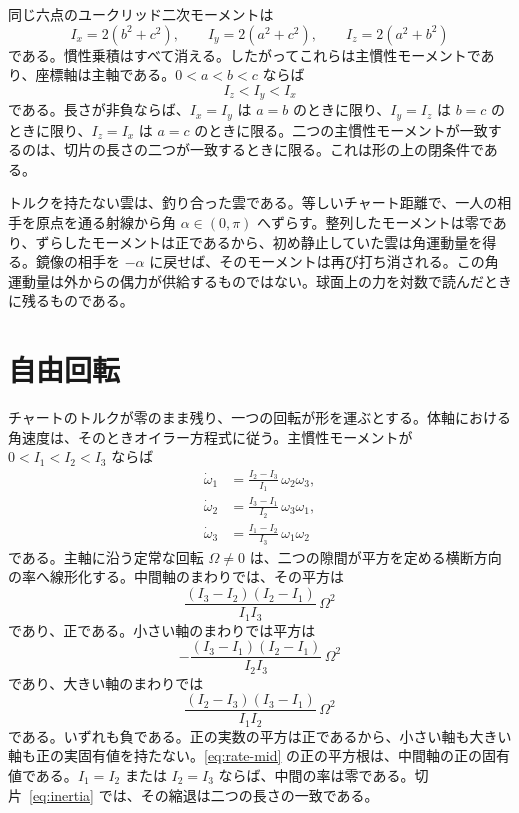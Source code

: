 \documentclass[a4paper]{article}
\begin{document}
同じ六点のユークリッド二次モーメントは
\begin{equation}
\label{eq:inertia}
I_x=2(b^2+c^2),\qquad
I_y=2(a^2+c^2),\qquad
I_z=2(a^2+b^2)
\end{equation}
である。慣性乗積はすべて消える。したがってこれらは主慣性モーメントであり、座標軸は主軸である。\(0<a<b<c\) ならば
\begin{equation}
\label{eq:order}
I_z<I_y<I_x
\end{equation}
である。長さが非負ならば、\(I_x=I_y\) は \(a=b\) のときに限り、\(I_y=I_z\) は \(b=c\) のときに限り、\(I_z=I_x\) は \(a=c\) のときに限る。二つの主慣性モーメントが一致するのは、切片の長さの二つが一致するときに限る。これは形の上の閉条件である。

トルクを持たない雲は、釣り合った雲である。等しいチャート距離で、一人の相手を原点を通る射線から角 \(\alpha\in(0,\pi)\) へずらす。整列したモーメントは零であり、ずらしたモーメントは正であるから、初め静止していた雲は角運動量を得る。鏡像の相手を \(-\alpha\) に戻せば、そのモーメントは再び打ち消される。この角運動量は外からの偶力が供給するものではない。球面上の力を対数で読んだときに残るものである。

\section{自由回転}
\label{sec:euler}

チャートのトルクが零のまま残り、一つの回転が形を運ぶとする。体軸における角速度は、そのときオイラー方程式に従う。主慣性モーメントが \(0<I_1<I_2<I_3\) ならば
\begin{equation}
\label{eq:euler}
\begin{aligned}
\dot\omega_1&=\frac{I_2-I_3}{I_1}\,\omega_2\omega_3,\\
\dot\omega_2&=\frac{I_3-I_1}{I_2}\,\omega_3\omega_1,\\
\dot\omega_3&=\frac{I_1-I_2}{I_3}\,\omega_1\omega_2
\end{aligned}
\end{equation}
である。主軸に沿う定常な回転 \(\Omega\neq 0\) は、二つの隙間が平方を定める横断方向の率へ線形化する。中間軸のまわりでは、その平方は
\begin{equation}
\label{eq:rate-mid}
\frac{(I_3-I_2)(I_2-I_1)}{I_1 I_3}\,\Omega^2
\end{equation}
であり、正である。小さい軸のまわりでは平方は
\[
-\frac{(I_3-I_1)(I_2-I_1)}{I_2 I_3}\,\Omega^2
\]
であり、大きい軸のまわりでは
\[
\frac{(I_2-I_3)(I_3-I_1)}{I_1 I_2}\,\Omega^2
\]
である。いずれも負である。正の実数の平方は正であるから、小さい軸も大きい軸も正の実固有値を持たない。\eqref{eq:rate-mid} の正の平方根は、中間軸の正の固有値である。\(I_1=I_2\) または \(I_2=I_3\) ならば、中間の率は零である。切片~\eqref{eq:inertia} では、その縮退は二つの長さの一致である。
\end{document}
